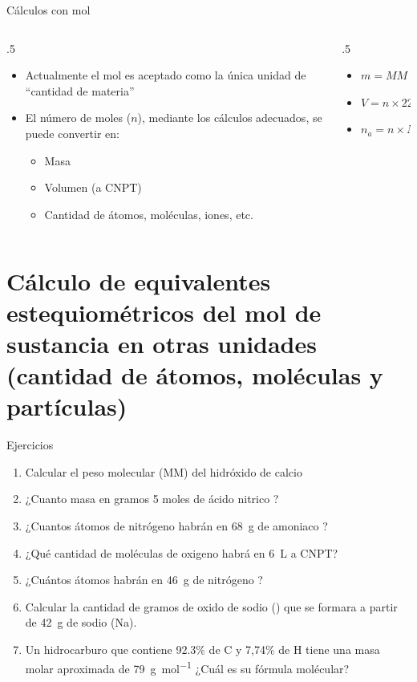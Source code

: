 \documentclass[11pt, aspectratio=169, xcolor=table]{beamer}
\begin{document}
\begin{frame}{Cálculos con mol}
	\begin{columns}
		\begin{column}{.5\textwidth}
			\begin{itemize}[<+->]
				\item Actualmente el mol es aceptado como la única unidad de ``cantidad de materia''
				\item El número de moles ($n$), mediante los cálculos adecuados, se puede convertir en:
				      \begin{itemize}[<+->]
					      \item Masa
					      \item Volumen (a CNPT)
					      \item Cantidad de átomos, moléculas, iones, etc.
				      \end{itemize}
			\end{itemize}
		\end{column}

		\begin{column}{.5\textwidth}
			\begin{itemize}
				\item<3-> $m = MM \times n$
				\item<4-> $V = n \times \qty{22,4}{\liter}$
				\item<5-> $n_a = n \times N_A$
			\end{itemize}

		\end{column}
	\end{columns}
\end{frame}

\section{Cálculo de equivalentes estequiométricos del mol de sustancia en otras unidades (cantidad de átomos, moléculas y partículas)}

\begin{frame}{Ejercicios}
	\begin{enumerate}
		\item Calcular el peso molecular (MM) del hidróxido de calcio 
		\item ¿Cuanto masa en gramos 5 moles de ácido nitrico ?
		\item ¿Cuantos átomos de nitrógeno habrán en \qty{68}{g} de amoniaco ?
		\item ¿Qué cantidad de moléculas de oxigeno habrá en \qty{6}{L} a CNPT?
		\item ¿Cuántos átomos habrán en \qty{46}{g} de nitrógeno ?
		\item Calcular la cantidad de gramos de oxido de sodio () que se formara a partir de \qty{42}{g} de sodio (Na).
		\item Un hidrocarburo que contiene 92.3\% de C y 7,74\% de H tiene una masa molar aproximada de \qty{79}{\gram\per\mol} ¿Cuál es su fórmula molécular?
	\end{enumerate}
\end{frame}
\end{document}
